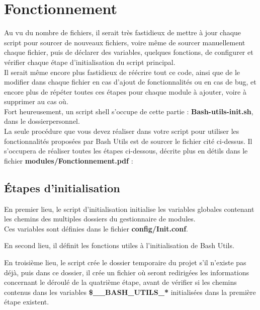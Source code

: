 \documentclass[a4paper,10pt]{article}
\begin{document}
\color{red}
\section{Fonctionnement}\color{white}
Au vu du nombre de fichiers, il serait très fastidieux de mettre à jour chaque script pour sourcer de nouveaux fichiers, voire même de sourcer manuellement chaque fichier, puis de déclarer des variables, quelques fonctions, de configurer et vérifier chaque étape d'initialisation du script principal.\\[1\baselineskip]

Il serait même encore plus fastidieux de réécrire tout ce code, ainsi que de le modifier dans chaque fichier en cas d'ajout de fonctionnalités ou en cas de bug, et encore plus de répéter toutes ces étapes pour chaque module à ajouter, voire à supprimer au cas où.\\[1\baselineskip]

Fort heureusement, un script shell s'occupe de cette partie : \color{lime}\textbf{Bash-utils-init.sh}\color{white}, dans le dossier\linebreak personnel.\\[1\baselineskip]

La seule procédure que vous devez réaliser dans votre script pour utiliser les fonctionnalités proposées par Bash Utils est de sourcer le fichier cité ci-dessus. Il s'occupera de réaliser toutes les étapes ci-dessous, décrite plus en détils dans le fichier \textbf{\color{lime}modules/Fonctionnement.pdf\color{white}} :


\color{green}
\subsection{Étapes d'initialisation}\color{white}
En premier lieu, le script d'initialisation initialise les variables globales contenant les chemins des multiples dossiers du gestionnaire de modules.\\[1\baselineskip]

Ces variables sont définies dans le fichier \color{lime}\textbf{config/Init.conf}\color{white}.

En second lieu, il définit les fonctions utiles à l'initialisation de Bash Utils.

En troisième lieu, le script crée le dossier temporaire du projet s'il n'existe pas déjà, puis dans ce dossier, il crée un fichier où seront redirigées les informations concernant le déroulé de la quatrième étape, avant de vérifier si les chemins contenus dans les variables \color{orange}\textbf{\$\_\_BASH\_UTILS\_*}\color{white} initialisées dans la première étape existent.
\end{document}
